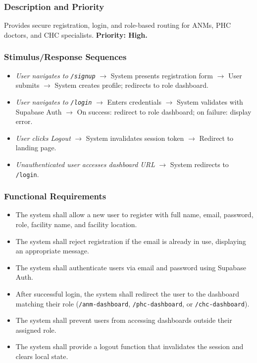 \documentclass[12pt,a4paper]{article}
\begin{document}
\subsubsection{Description and Priority}
Provides secure registration, login, and role-based routing for ANMs, PHC doctors, and CHC specialists. \textbf{Priority: High.}

\subsubsection{Stimulus/Response Sequences}
\begin{itemize}
    \item \textit{User navigates to \texttt{/signup}} $\rightarrow$ System presents registration form $\rightarrow$ User submits $\rightarrow$ System creates profile; redirects to role dashboard.
    \item \textit{User navigates to \texttt{/login}} $\rightarrow$ Enters credentials $\rightarrow$ System validates with Supabase Auth $\rightarrow$ On success: redirect to role dashboard; on failure: display error.
    \item \textit{User clicks Logout} $\rightarrow$ System invalidates session token $\rightarrow$ Redirect to landing page.
    \item \textit{Unauthenticated user accesses dashboard URL} $\rightarrow$ System redirects to \texttt{/login}.
\end{itemize}

\subsubsection{Functional Requirements}
\begin{itemize}
    \item[\texttt{REQ-AUTH-01}] The system shall allow a new user to register with full name, email, password, role, facility name, and facility location.
    \item[\texttt{REQ-AUTH-02}] The system shall reject registration if the email is already in use, displaying an appropriate message.
    \item[\texttt{REQ-AUTH-03}] The system shall authenticate users via email and password using Supabase Auth.
    \item[\texttt{REQ-AUTH-04}] After successful login, the system shall redirect the user to the dashboard matching their role (\texttt{/anm-dashboard}, \texttt{/phc-dashboard}, or \texttt{/chc-dashboard}).
    \item[\texttt{REQ-AUTH-05}] The system shall prevent users from accessing dashboards outside their assigned role.
    \item[\texttt{REQ-AUTH-06}] The system shall provide a logout function that invalidates the session and clears local state.
\end{itemize}
\end{document}
